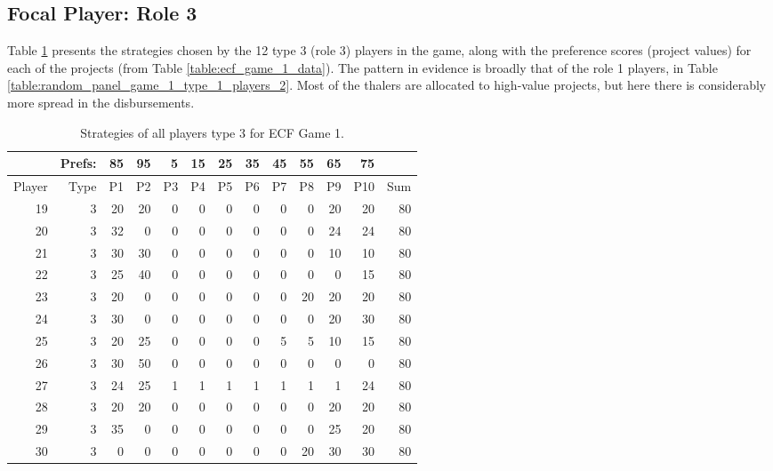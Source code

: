 \documentclass[11pt, oneside]{article}   	%
\begin{document}
\newpage\clearpage

\subsection{Focal Player: Role 3}

Table \ref{table:random_panel_game_1_type_3_players} presents the strategies chosen by the
12 type 3 (role 3) players in the game, along with  the preference scores (project values) for each of the projects (from Table \ref{table:ecf_game_1_data}). The pattern in evidence is broadly that of the role 1 players, in Table \ref{table:random_panel_game_1_type_1_players_2}. Most of the thalers are allocated to high-value projects, but here there is considerably more spread in the disbursements.

 \begin{table}[h]
 \figtop
 
 \centering
\begin{tabular}{rrrrrrrrrrrrr}
 & Prefs: & 85 & 95 & 5 & 15 & 25 & 35 & 45 & 55 & 65 & 75 & \\ \hline
Player & Type & P1 & P2 & P3 & P4 & P5 & P6 & P7 & P8 & P9 & P10 & Sum \\ \hline
19 & 3 & 20 & 20 & 0 & 0 & 0 & 0 & 0 & 0 & 20 & 20 & 80 \\ 
20 & 3 & 32 & 0 & 0 & 0 & 0 & 0 & 0 & 0 & 24 & 24 & 80 \\ 
21 & 3 & 30 & 30 & 0 & 0 & 0 & 0 & 0 & 0 & 10 & 10 & 80 \\ 
22 & 3 & 25 & 40 & 0 & 0 & 0 & 0 & 0 & 0 & 0 & 15 & 80 \\ 
23 & 3 & 20 & 0 & 0 & 0 & 0 & 0 & 0 & 20 & 20 & 20 & 80 \\ 
24 & 3 & 30 & 0 & 0 & 0 & 0 & 0 & 0 & 0 & 20 & 30 & 80 \\ 
25 & 3 & 20 & 25 & 0 & 0 & 0 & 0 & 5 & 5 & 10 & 15 & 80 \\ 
26 & 3 & 30 & 50 & 0 & 0 & 0 & 0 & 0 & 0 & 0 & 0 & 80 \\ 
27 & 3 & 24 & 25 & 1 & 1 & 1 & 1 & 1 & 1 & 1 & 24 & 80 \\ 
28 & 3 & 20 & 20 & 0 & 0 & 0 & 0 & 0 & 0 & 20 & 20 & 80 \\ 
29 & 3 & 35 & 0 & 0 & 0 & 0 & 0 & 0 & 0 & 25 & 20 & 80 \\ 
30 & 3 & 0 & 0 & 0 & 0 & 0 & 0 & 0 & 20 & 30 & 30 & 80 \\  \end{tabular}
 \caption{Strategies of all players type 3 for ECF Game 1.}
 \label{table:random_panel_game_1_type_3_players}
 \figbot
\end{table}
\end{document}
